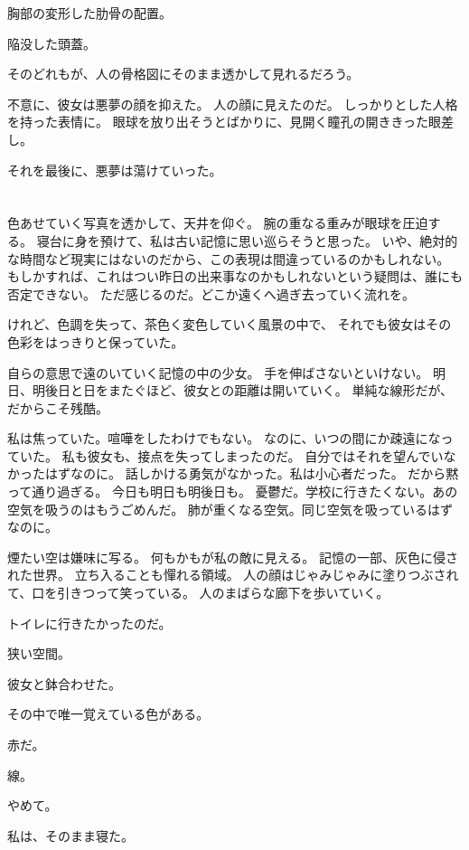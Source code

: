\documentclass[../IHMain]{subfiles}
\begin{document}
胸部の変形した肋骨の配置。

陥没した頭蓋。

そのどれもが、人の骨格図にそのまま透かして見れるだろう。

不意に、彼女は悪夢の顔を抑えた。
人の顔に見えたのだ。
しっかりとした人格を持った表情に。
眼球を放り出そうとばかりに、見開く瞳孔の開ききった眼差し。

それを最後に、悪夢は蕩けていった。

\section{}
色あせていく写真を透かして、天井を仰ぐ。
腕の重なる重みが眼球を圧迫する。
寝台に身を預けて、私は古い記憶に思い巡らそうと思った。
いや、絶対的な時間など現実にはないのだから、この表現は間違っているのかもしれない。
もしかすれば、これはつい昨日の出来事なのかもしれないという疑問は、誰にも否定できない。
ただ感じるのだ。どこか遠くへ過ぎ去っていく流れを。

けれど、色調を失って、茶色く変色していく風景の中で、
それでも彼女はその色彩をはっきりと保っていた。

自らの意思で遠のいていく記憶の中の少女。
手を伸ばさないといけない。
明日、明後日と日をまたぐほど、彼女との距離は開いていく。
単純な線形だが、だからこそ残酷。

私は焦っていた。喧嘩をしたわけでもない。
なのに、いつの間にか疎遠になっていた。
私も彼女も、接点を失ってしまったのだ。
自分ではそれを望んでいなかったはずなのに。
話しかける勇気がなかった。私は小心者だった。
だから黙って通り過ぎる。
今日も明日も明後日も。
憂鬱だ。学校に行きたくない。あの空気を吸うのはもうごめんだ。
肺が重くなる空気。同じ空気を吸っているはずなのに。

煙たい空は嫌味に写る。
何もかもが私の敵に見える。
記憶の一部、灰色に侵された世界。
立ち入ることも憚れる領域。
人の顔はじゃみじゃみに塗りつぶされて、口を引きつって笑っている。
人のまばらな廊下を歩いていく。

トイレに行きたかったのだ。

狭い空間。

彼女と鉢合わせた。

その中で唯一覚えている色がある。

赤だ。

線。

やめて。

私は、そのまま寝た。
\end{document}
